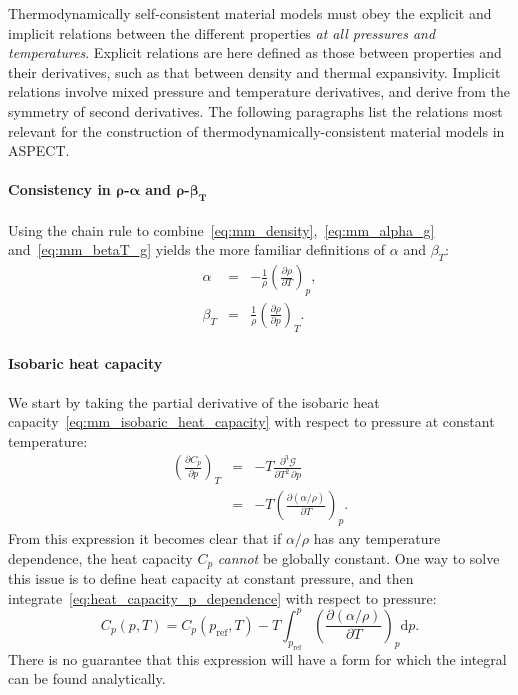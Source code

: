 \documentclass{article}
\newcommand{\aspect}{\textsc{ASPECT}}
\begin{document}
Thermodynamically self-consistent material models must obey the explicit and implicit relations
between the different properties \emph{at all pressures and temperatures}. Explicit relations
are here defined as those between properties and their derivatives, such as that between
density and thermal expansivity. Implicit relations involve mixed pressure and temperature
derivatives, and derive from the symmetry of second derivatives. The following paragraphs
list the relations most relevant for the construction of thermodynamically-consistent material
models in \aspect{}.

\paragraph{Consistency in $\boldsymbol{\rho}$-$\boldsymbol{\alpha}$ and $\boldsymbol{\rho}$-$\boldsymbol{\beta_T}$}
Using the chain rule to combine~\eqref{eq:mm_density},~\eqref{eq:mm_alpha_g}
and~\eqref{eq:mm_betaT_g} yields the more familiar definitions of $\alpha$ and $\beta_T$:
\begin{eqnarray}
  \alpha &=& -\frac{1}{\rho} \left( \frac{\partial \rho}{\partial T} \right)_{p}, \label{eq:mm_thermal_expansivity} \\
  \beta_T &=& \frac{1}{\rho} \left( \frac{\partial \rho}{\partial p} \right)_{T}. \label{eq:mm_isothermal_compressibility}
\end{eqnarray}

\paragraph{Isobaric heat capacity}

We start by taking the partial derivative of the isobaric heat
capacity~\eqref{eq:mm_isobaric_heat_capacity} with respect to pressure at constant temperature:
\begin{eqnarray}
  \left( \frac{\partial C_p}{\partial p} \right)_{T} &=& -T \frac{\partial^3 \mathcal{G}}{\partial {T}^2 \, \partial {p}} \\
  &=& -T \left( \frac{\partial \left(\alpha / \rho \right)}{\partial T} \right)_{p}. \label{eq:heat_capacity_p_dependence}
\end{eqnarray}
From this expression it becomes clear that if $\alpha / \rho$ has any temperature dependence,
the heat capacity $C_p$ \emph{cannot} be globally constant. One way to solve this issue is to define
heat capacity at constant pressure, and then integrate~\eqref{eq:heat_capacity_p_dependence}
with respect to pressure:
\begin{equation}
  C_p(p, T)
  = C_p(p_{\textrm{ref}}, T) -T \int_{p_{\textrm{ref}}}^p
  \left(\frac{\partial \left(\alpha / \rho \right)}{\partial T} \right)_{p}
  \text{d}p.
\end{equation}
There is no guarantee that this expression will have a form for which the integral can be found analytically.
\end{document}
